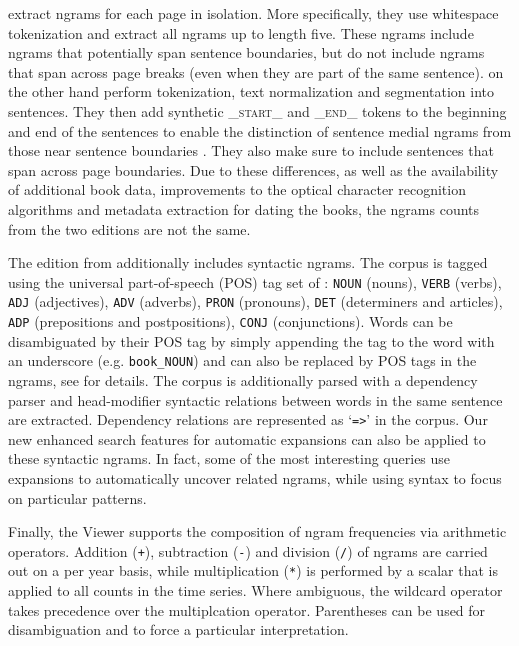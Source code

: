 \documentclass[11pt,a4paper]{article}
\newcommand{\query}[1]{\texttt{#1}}
\begin{document}
 extract ngrams for each page in isolation. More specifically, they use whitespace tokenization and extract all ngrams up to length five. These ngrams include ngrams that potentially span sentence boundaries, but do not include ngrams that span across page breaks (even when they are part of the same sentence).
 on the other hand perform tokenization, text normalization and segmentation into sentences. They then add synthetic \textsf{\textsc{\_start\_}} and \textsf{\textsc{\_end\_}} tokens to the beginning and end of the sentences to enable the distinction of sentence medial ngrams from those near sentence boundaries \cite{lin2012syntactic}. They also make sure to include sentences that span across page boundaries. Due to these differences, as well as the availability of additional book data, improvements to the optical character recognition algorithms and metadata extraction for dating the books, the ngrams counts from the two editions are not the same.

The edition from  additionally includes syntactic ngrams. The corpus is tagged using the universal part-of-speech (POS) tag set of : \query{NOUN} (nouns), \query{VERB} (verbs), \query{ADJ} (adjectives), \query{ADV} (adverbs), \query{PRON} (pronouns), \query{DET} (determiners and articles), \query{ADP} (prepositions and postpositions), \query{CONJ} (conjunctions). Words can be disambiguated by their POS tag by simply appending the tag to the word with an underscore (e.g. \texttt{book\_NOUN}) and can also be replaced by POS tags in the ngrams, see  for details. The corpus is additionally parsed with a dependency parser and head-modifier syntactic relations between words in the same sentence are extracted. Dependency relations are represented as `\query{=>}' in the corpus. Our new enhanced search features for automatic expansions can also be applied to these syntactic ngrams. In fact, some of the most interesting queries use expansions to automatically uncover related ngrams, while using syntax to focus on particular patterns.

Finally, the Viewer supports the composition of ngram frequencies via arithmetic operators. Addition (\query{+}), subtraction (\query{-}) and division (\query{/}) of ngrams are carried out on a per year basis, while multiplication (\query{*}) is performed by a scalar that is applied to all counts in the time series. Where ambiguous, the wildcard operator takes precedence over the multiplcation operator. Parentheses can be used for disambiguation and to force a particular interpretation.
\end{document}
